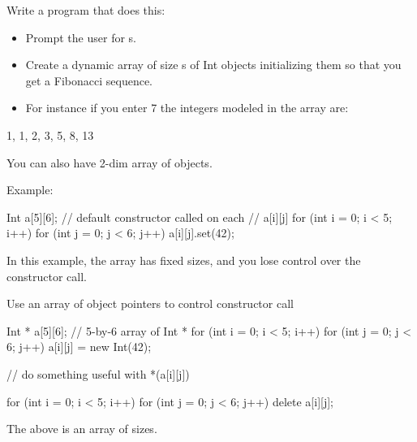 \begin{ex}
Write a program that does this:

\begin{itemize}
\item
  Prompt the user for s.
\item
  Create a dynamic array of size s of Int objects initializing them so
  that you get a Fibonacci sequence.
\item
  For instance if you enter 7 the integers modeled in the array are:
\end{itemize}
\begin{center}
1, 1, 2, 3, 5, 8, 13
\end{center}
You can also have 2-dim array of objects.

Example:
\begin{console}
Int a[5][6]; // default constructor called on each
             // a[i][j]
for (int i = 0; i < 5; i++)
    for (int j = 0; j < 6; j++)
        a[i][j].set(42);
\end{console}
\end{ex}
In this example, the array has fixed sizes, and you lose control over
the constructor call.

Use an array of object pointers to control constructor call
\begin{console}
Int * a[5][6]; // 5-by-6 array of Int *
for (int i = 0; i < 5; i++)
    for (int j = 0; j < 6; j++)
        a[i][j] = new Int(42);

// do something useful with *(a[i][j])

for (int i = 0; i < 5; i++)
    for (int j = 0; j < 6; j++)
        delete a[i][j];
\end{console}
The above is an array of  sizes.

